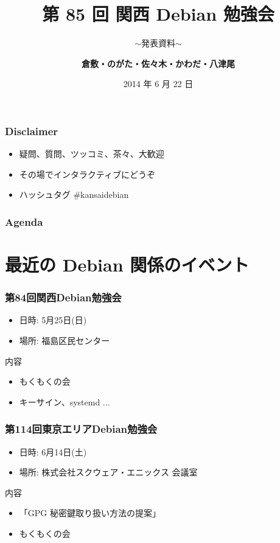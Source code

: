 \documentclass[cjk,dvipdfmx,10pt,compress,%
hyperref={bookmarks=true,bookmarksnumbered=true,bookmarksopen=false,%
colorlinks=false,%
pdftitle={第 85 回 関西 Debian 勉強会},%
pdfauthor={倉敷・のがた・佐々木・かわだ・八津尾},%
pdfsubject={資料},%
}]{beamer}
\title{第 85 回 関西 Debian 勉強会}
\subtitle{$\sim$発表資料$\sim$}
\author[かわだ てつたろう]{{\large\bf 倉敷・のがた・佐々木・かわだ・八津尾}}
\institute[Debian JP]{{\normalsize\tt 関西 Debian 勉強会}}
\date{{\small 2014 年 6 月 22 日}}
\begin{document}
\settitleslide
\begin{frame}
\titlepage
\end{frame}
\setdefaultslide

\begin{frame}[fragile]
  \frametitle{Disclaimer}
  \begin{itemize}
  \item 疑問、質問、ツッコミ、茶々、\alert{大歓迎}
  \item その場でインタラクティブにどうぞ
  \item ハッシュタグ \#kansaidebian
\end{itemize}
\end{frame}

\begin{frame}[fragile]
\frametitle{Agenda}

\tableofcontents

\end{frame}

\section{最近の Debian 関係のイベント}


\begin{frame}[fragile]
  \frametitle{第84回関西Debian勉強会}
  \begin{itemize}
  \item 日時: 5月25日(日)
  \item 場所: 福島区民センター
  \end{itemize}
  \begin{block}{内容}
    \begin{itemize}
    \item もくもくの会
    \item キーサイン、systemd ...
    \end{itemize}
  \end{block}
\end{frame}

\begin{frame}[fragile]
  \frametitle{第114回東京エリアDebian勉強会}
  \begin{itemize}
  \item 日時: 6月14日(土)
  \item 場所: 株式会社スクウェア・エニックス 会議室
  \end{itemize}
  \begin{block}{内容}
    \begin{itemize}
    \item 「GPG 秘密鍵取り扱い方法の提案」
    \item もくもくの会
    \end{itemize}
  \end{block}
\end{frame}
\end{document}
